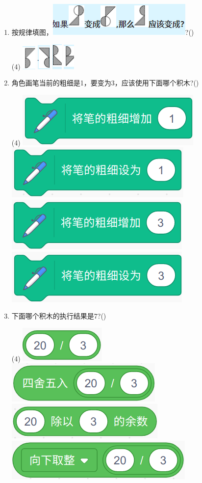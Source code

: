 \documentclass[10pt, a4paper]{article}
\begin{document}
\begin{enumerate}
        \item 按规律填图，\includegraphics[width=.2\textwidth]{20.png}?(\qquad)
        \begin{tasks}(4)
            \task \includegraphics[width=.02\textwidth]{20a.png}
            \task \includegraphics[width=.02\textwidth]{20b.png}
            \task \includegraphics[width=.015\textwidth]{20c.png}
            \task \includegraphics[width=.02\textwidth]{20d.png}
        \end{tasks}

        \item 角色画笔当前的粗细是1，要变为3，应该使用下面哪个积木?(\qquad)
        \begin{tasks}(4)
            \task \includegraphics[width=.15\textwidth]{21a.png}
            \task \includegraphics[width=.15\textwidth]{21b.png}
            \task \includegraphics[width=.15\textwidth]{21c.png}
            \task \includegraphics[width=.15\textwidth]{21d.png}
        \end{tasks}

        \item 下面哪个积木的执行结果是7?(\qquad)
        \begin{tasks}(4)
            \task \includegraphics[width=.08\textwidth]{22a.png}
            \task \includegraphics[width=.12\textwidth]{22b.png}
            \task \includegraphics[width=.15\textwidth]{22c.png}
            \task \includegraphics[width=.15\textwidth]{22d.png}
        \end{tasks}


\end{enumerate}
\end{document}
